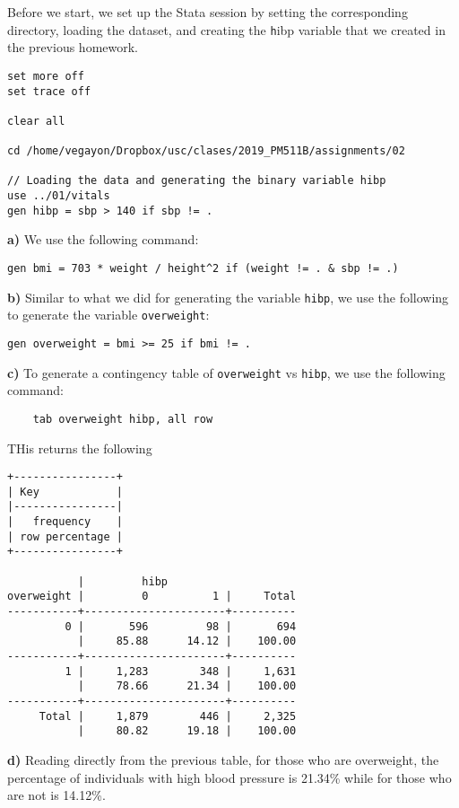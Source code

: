 \documentclass{article}
\begin{document}
Before we start, we set up the Stata session by setting the corresponding directory, loading the dataset, and creating the {\texttt hibp} variable that we created in the previous homework.

\begin{verbatim}
set more off
set trace off

clear all

cd /home/vegayon/Dropbox/usc/clases/2019_PM511B/assignments/02

// Loading the data and generating the binary variable hibp
use ../01/vitals
gen hibp = sbp > 140 if sbp != .
\end{verbatim}

\textbf{a)} We use the following command:
\begin{verbatim}
gen bmi = 703 * weight / height^2 if (weight != . & sbp != .)
\end{verbatim}

\textbf{b)} Similar to what we did for generating the variable \texttt{hibp}, we use the following to generate the variable \texttt{overweight}:

\begin{verbatim} 
gen overweight = bmi >= 25 if bmi != .
\end{verbatim}

\textbf{c)} To generate a contingency table of \texttt{overweight} vs \texttt{hibp}, we use the following command:

\begin{verbatim}
    tab overweight hibp, all row
\end{verbatim}

THis returns the following

\begin{verbatim}
+----------------+
| Key            |
|----------------|
|   frequency    |
| row percentage |
+----------------+

           |         hibp
overweight |         0          1 |     Total
-----------+----------------------+----------
         0 |       596         98 |       694 
           |     85.88      14.12 |    100.00 
-----------+----------------------+----------
         1 |     1,283        348 |     1,631 
           |     78.66      21.34 |    100.00 
-----------+----------------------+----------
     Total |     1,879        446 |     2,325 
           |     80.82      19.18 |    100.00 
\end{verbatim}

\textbf{d)} Reading directly from the previous table, for those who are overweight, the percentage of individuals with high blood pressure is 21.34\% while for those who are not is 14.12\%.
\end{document}
